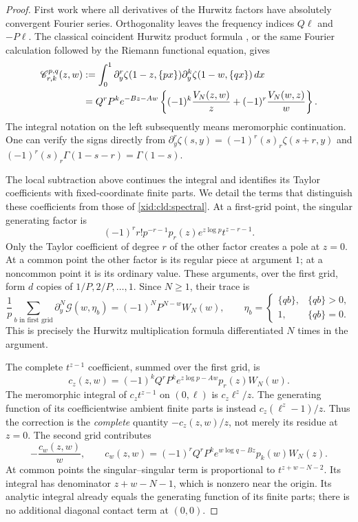 \begin{proof}
First work where all derivatives of the Hurwitz factors have absolutely
convergent Fourier series.  Orthogonality leaves the frequency indices
$Q\ell$ and $-P\ell$.  The classical coincident Hurwitz product formula
\cite[Theorem 3.1]{EspinosaMoll1}, or the same Fourier calculation followed
by the Riemann functional equation, gives
\begin{align}
 \mathscr C_{r,k}^{p,q}(z,w)
 &:=\int_0^1
    \partial_y^r\zeta(1-z,\{px\})
    \partial_y^k\zeta(1-w,\{qx\})\,dx\notag\\
 &=Q^rP^ke^{-Bz-Aw}
       \left\{(-1)^k\frac{V_N(z,w)}z
                   +(-1)^r\frac{V_N(w,z)}w\right\}.
 \label{xid:cld:spectral}
\end{align}
The integral notation on the left subsequently means meromorphic
continuation.  One can verify the signs directly from
$\partial_y^r\zeta(s,y)=(-1)^r(s)_r\zeta(s+r,y)$ and
$(-1)^r(s)_r\Gamma(1-s-r)=\Gamma(1-s)$.

The local subtraction above continues the integral and identifies its
Taylor coefficients with fixed-coordinate finite parts.  We detail the
terms that distinguish these coefficients from those of
\eqref{xid:cld:spectral}.  At a first-grid point, the singular generating
factor is
\[
 (-1)^r r!p^{-r-1}p_r(z)e^{z\log p}t^{z-r-1}.
\]
Only the Taylor coefficient of degree $r$ of the other factor creates a
pole at $z=0$.  At a common point the other factor is its regular piece
at argument $1$; at a noncommon point it is its ordinary value.  These
arguments, over the first grid, form $d$ copies of
$1/P,2/P,\ldots,1$.  Since $N\ge1$, their trace is
\[
 \frac1p\sum_{b\text{ in first grid}}
      \partial_y^N\mathscr G(w,\eta_b)
   =(-1)^N P^{N-w}W_N(w),
 \qquad \eta_b=\begin{cases}\{qb\},&\{qb\}>0,\\1,&\{qb\}=0.
                         \end{cases}
\]
This is precisely the Hurwitz multiplication formula differentiated
$N$ times in the argument.

The complete $t^{z-1}$ coefficient, summed over the first grid, is
\[
 c_z(z,w)=(-1)^kQ^rP^k e^{z\log p-Aw}p_r(z)W_N(w).
\]
The meromorphic integral of $c_z t^{z-1}$ on $(0,\ell)$ is
$c_z\ell^z/z$.  The generating function of its coefficientwise
ambient finite parts is instead $c_z(\ell^z-1)/z$.
Thus the correction is the \emph{complete} quantity $-c_z(z,w)/z$,
not merely its residue at $z=0$.  The second grid contributes
\[
 -\frac{c_w(z,w)}w,
 \qquad
 c_w(z,w)=(-1)^rQ^rP^k e^{w\log q-Bz}p_k(w)W_N(z).
\]
At common points the singular--singular term is proportional to
$t^{z+w-N-2}$.  Its integral has denominator $z+w-N-1$, which is
nonzero near the origin.  Its analytic integral already equals the
generating function of its finite parts; there is no additional
diagonal contact term at $(0,0)$.


\end{proof}
